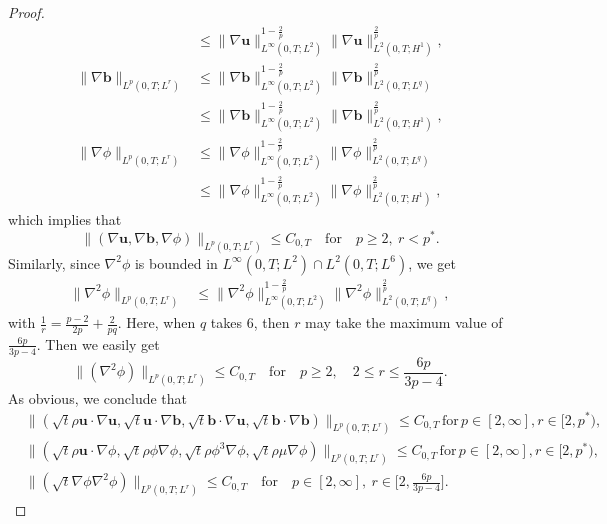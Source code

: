 \documentclass[11pt]{article}
\numberwithin{equation}{section}
\begin{document}
\begin{proof}
\begin{align*}
&\le \|\nabla \mathbf{u}\|_{L^\infty(0,T;L^2)}^{1 - \frac{2}{p}} \|\nabla \mathbf{u}\|_{L^2(0,T;H^1)}^{\frac{2}{p}}, \\
\|\nabla \mathbf{b}\|_{L^p(0,T;L^r)} &\le \|\nabla \mathbf{b}\|_{L^\infty(0,T;L^2)}^{1 - \frac{2}{p}} \|\nabla \mathbf{b}\|_{L^2(0,T;L^q)}^{\frac{2}{p}} \\
&\le \|\nabla \mathbf{b}\|_{L^\infty(0,T;L^2)}^{1 - \frac{2}{p}} \|\nabla \mathbf{b}\|_{L^2(0,T;H^1)}^{\frac{2}{p}}, \\
\|\nabla \phi\|_{L^p(0,T;L^r)} &\le \|\nabla \phi\|_{L^\infty(0,T;L^2)}^{1 - \frac{2}{p}} \|\nabla \phi\|_{L^2(0,T;L^q)}^{\frac{2}{p}} \\
&\le \|\nabla \phi\|_{L^\infty(0,T;L^2)}^{1 - \frac{2}{p}} \|\nabla \phi\|_{L^2(0,T;H^1)}^{\frac{2}{p}},
\end{align*}
which implies that
\begin{equation}
\|(\nabla \mathbf{u}, \nabla \mathbf{b}, \nabla \phi)\|_{L^p(0,T;L^r)} \le C_{0,T} \quad \text{for} \quad p \ge 2, \ r < p^*.
\end{equation}
Similarly, since $\nabla^2\phi$ is bounded in $L^\infty(0, T; L^2) \cap L^2(0, T; L^6)$, we get
\begin{align*}
\|\nabla ^2\phi\|_{L^p(0,T;L^r)} &\le \|\nabla ^2\phi\|_{L^\infty(0,T;L^2)}^{1 - \frac{2}{p}} \|\nabla ^2\phi\|_{L^2(0,T;L^q)}^{\frac{2}{p}},
\end{align*}
with \(\frac{1}{r} = \frac{p - 2}{2p} + \frac{2}{pq}\). Here, when \(q\) takes \(6\), then \(r\) may take the maximum value of \(\frac{6p}{3p - 4}\). Then we easily get
\begin{equation}
\|(\nabla^2\phi)\|_{L^p(0,T;L^r)} \le C_{0,T} \quad \text{for} \quad p \ge 2,\quad 2\leq r \leq \frac{6p}{3p - 4}.
\end{equation}
As obvious, we conclude that
\begin{align*}
&\| (\sqrt{t} \rho \mathbf{u} \cdot \nabla \mathbf{u}, \sqrt{t} \mathbf{u} \cdot \nabla \mathbf{b}, \sqrt{t}\mathbf{b} \cdot \nabla \mathbf{u}, \sqrt{t}\mathbf{b} \cdot \nabla \mathbf{b}) \|_{L^p(0,T; L^r)} \leq C_{0,T}\,  \text{for}\,  p \in [2,\infty],  r \in [2,p^*),\\
&\|( \sqrt{t} \rho \mathbf{u} \cdot\nabla \phi, \sqrt{t} \rho \phi \nabla \phi, \sqrt{t}\rho \phi^3 \nabla \phi, \sqrt{t} \rho \mu \nabla \phi ) \|_{L^p(0,T; L^r)} \leq C_{0,T}\, \text{for}\,  p \in [2,\infty],  r \in [2,p^*),\\
&\| (\sqrt{t} \nabla \phi\nabla^2 \phi) \|_{L^p(0,T; L^r)} \leq C_{0,T} \quad \text{for} \quad p \in [2,\infty], \ r \in \big[2, \frac{6p}{3p - 4}\big].

\end{align*}
\end{proof}
\end{document}
